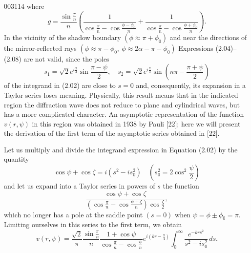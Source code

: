 \begin{scanpage}{0031}{14}
where
\[g=\frac{\sin\frac\pi n}{n}\left(\frac1{\cos\frac\pi n-\cos\frac{\phi-\phi_0}{n}}+\frac1{\cos\frac\pi n-\cos\frac{\phi+\phi_0}{n}}\right).\tag{2.08}\]
In the vicinity of the shadow boundary $(\phi\approx\pi+\phi_0)$ and near the directions of the mirror-reflected rays $(\phi\approx\pi-\phi_0,\ \phi\approx2\alpha-\pi-\phi_0)$ Expressions (2.04)--(2.08) are not valid, since the poles
\[s_1=\sqrt2e^{i\frac\pi4}\sin\frac{\pi-\psi}{2},\quad s_2=\sqrt2e^{i\frac\pi4}\sin\left(n\pi-\frac{\pi+\psi}{2}\right)\]
of the integrand in (2.02) are close to $s=0$ and, consequently, its expansion in a Taylor series loses meaning. Physically, this result means that in the indicated region the diffraction wave does not reduce to plane and cylindrical waves, but has a more complicated character. An asymptotic representation of the function $v(r,\psi)$ in this region was obtained in 1938 by Pauli [22]; here we will present the derivation of the first term of the asymptotic series obtained in [22].

Let us multiply and divide the integrand expression in Equation (2.02) by the quantity
\[\cos\psi+\cos\zeta=i(s^2-is_0^2)\quad\left(s_0^2=2\cos^2\frac\psi2\right)\tag{2.09}\]
and let us expand into a Taylor series in powers of $s$ the function
\[\frac{\cos\psi+\cos\zeta}{\left(\cos\frac\pi n-\cos\frac{\psi+\zeta}{n}\right)\cos\frac\zeta2},\]
which no longer has a pole at the saddle point $(s=0)$ when $\psi=\phi\pm\phi_0=\pi$. Limiting ourselves in this series to the first term, we obtain
\[v(r,\psi)=\frac{\sqrt2}{\pi}\frac{\sin\frac\pi n}{n}\frac{1+\cos\psi}{\cos\frac\pi n-\cos\frac\psi n}e^{i(kr-\frac\pi4)}\int_0^\infty\frac{e^{-krs^2}}{s^2-is_0^2}\,ds.\tag{2.10}\]
\end{scanpage}
